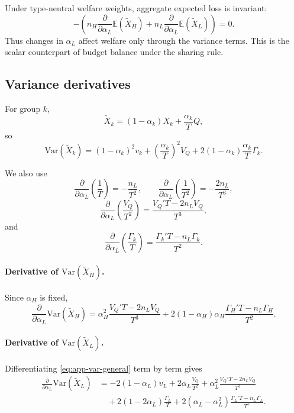\documentclass[a4paper,12pt]{article}
\theoremstyle{definition}
\theoremstyle{remark}
\newcommand{\E}{\mathbb{E}}
\newcommand{\Var}{\mathrm{Var}}
\newcommand{\1}{\mathbf{1}}
\begin{document}
Under type-neutral welfare weights, aggregate expected loss is invariant:
\[
-\left(
n_H\frac{\partial}{\partial \alpha_L}\E(\tilde X_H)
+
n_L\frac{\partial}{\partial \alpha_L}\E(\tilde X_L)
\right)=0.
\]
Thus changes in \(\alpha_L\) affect welfare only through the variance terms.
This is the scalar counterpart of budget balance under the sharing rule.

\subsection{Variance derivatives}
\label{app:alphaL-var}

For group \(k\),
\[
\tilde X_k=(1-\alpha_k)X_k+\frac{\alpha_k}{T}Q,
\]
so
\begin{equation}
\Var(\tilde X_k)
=
(1-\alpha_k)^2v_k
+
\left(\frac{\alpha_k}{T}\right)^2V_Q
+
2(1-\alpha_k)\frac{\alpha_k}{T}\Gamma_k.
\label{eq:app-var-general}
\end{equation}

We also use
\[
\frac{\partial}{\partial \alpha_L}\left(\frac{1}{T}\right)
=
-\frac{n_L}{T^2},
\qquad
\frac{\partial}{\partial \alpha_L}\left(\frac{1}{T^2}\right)
=
-\frac{2n_L}{T^3},
\]
\begin{equation}
\frac{\partial}{\partial \alpha_L}\left(\frac{V_Q}{T^2}\right)
=
\frac{V_Q'T-2n_LV_Q}{T^3},
\label{eq:app-D1}
\end{equation}
and
\begin{equation}
\frac{\partial}{\partial \alpha_L}\left(\frac{\Gamma_k}{T}\right)
=
\frac{\Gamma_k'T-n_L\Gamma_k}{T^2}.
\label{eq:app-D2}
\end{equation}

\paragraph{Derivative of \(\Var(\tilde X_H)\).}
Since \(\alpha_H\) is fixed,
\begin{equation}
\frac{\partial}{\partial \alpha_L}\Var(\tilde X_H)
=
\alpha_H^2\frac{V_Q'T-2n_LV_Q}{T^3}
+
2(1-\alpha_H)\alpha_H\frac{\Gamma_H'T-n_L\Gamma_H}{T^2}.
\label{eq:app-dVarH-raw}
\end{equation}

\paragraph{Derivative of \(\Var(\tilde X_L)\).}
Differentiating \eqref{eq:app-var-general} term by term gives
\begin{equation}
\begin{aligned}
\frac{\partial}{\partial \alpha_L}\Var(\tilde X_L)
&=
-2(1-\alpha_L)v_L
+2\alpha_L\frac{V_Q}{T^2}
+\alpha_L^2\frac{V_Q'T-2n_LV_Q}{T^3} \\
&\quad
+2(1-2\alpha_L)\frac{\Gamma_L}{T}
+2(\alpha_L-\alpha_L^2)\frac{\Gamma_L'T-n_L\Gamma_L}{T^2}.
\end{aligned}
\label{eq:app-dVarL-raw}
\end{equation}
\end{document}
